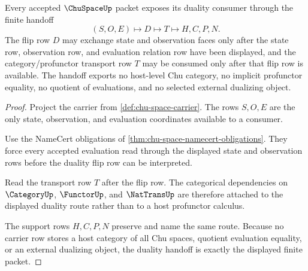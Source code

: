 \begin{theorem}
\label{thm:chu-space-duality-handoff}
Every accepted $\ChuSpaceUp$ packet exposes its duality consumer through the finite handoff
$$
(S,O,E)\longmapsto D\longmapsto T\longmapsto H,C,P,N .
$$
The flip row $D$ may exchange state and observation faces only after the state row, observation row, and evaluation relation row have been displayed, and the category/profunctor transport row $T$ may be consumed only after that flip row is available. The handoff exports no host-level Chu category, no implicit profunctor equality, no quotient of evaluations, and no selected external dualizing object.
\end{theorem}
\begin{proof}
Project the carrier from \autoref{def:chu-space-carrier}. The rows $S,O,E$ are the only state, observation, and evaluation coordinates available to a consumer.

Use the NameCert obligations of \autoref{thm:chu-space-namecert-obligations}. They force every accepted evaluation read through the displayed state and observation rows before the duality flip row can be interpreted.

Read the transport row $T$ after the flip row. The categorical dependencies on $\CategoryUp$, $\FunctorUp$, and $\NatTransUp$ are therefore attached to the displayed duality route rather than to a host profunctor calculus.

The support rows $H,C,P,N$ preserve and name the same route. Because no carrier row stores a host category of all Chu spaces, quotient evaluation equality, or an external dualizing object, the duality handoff is exactly the displayed finite packet.
\end{proof}




